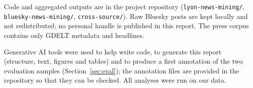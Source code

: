 \documentclass[pdflatex,sn-mathphys-num]{sn-jnl}
\begin{document}
 Code and aggregated outputs are in the project repository (\texttt{lyon-news-mining/}, \texttt{bluesky-news-mining/}, \texttt{cross-source/}). Raw Bluesky posts are kept locally and not redistributed; no personal handle is published in this report. The press corpus contains only GDELT metadata and headlines.

 Generative AI tools were used to help write code, to generate this report (structure, text, figures and tables) and to produce a first annotation of the two evaluation samples (Section~\ref{sec:eval}); the annotation files are provided in the repository so that they can be checked. All analyses were run on our data.


\end{document}
